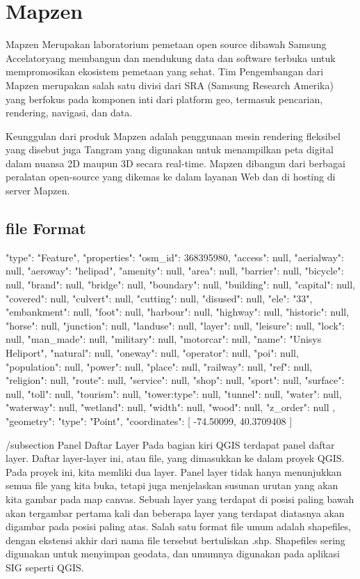 \section{Mapzen}
Mapzen Merupakan laboratorium pemetaan open source dibawah Samsung Accelatoryang membangun dan mendukung data dan software terbuka untuk mempromosikan ekosistem pemetaan yang sehat. Tim Pengembangan dari Mapzen merupakan salah satu divisi dari SRA (Samsung Research Amerika) yang berfokus pada komponen inti dari platform geo, termasuk pencarian, rendering, navigasi, dan data.

Keunggulan dari produk Mapzen adalah penggunaan mesin rendering fleksibel yang disebut juga Tangram yang digunakan untuk menampilkan peta digital dalam nuansa 2D maupun 3D secara real-time. Mapzen dibangun dari berbagai peralatan open-source yang dikemas ke dalam layanan Web dan di hosting di server Mapzen.

\subsection{file Format}
{
"type": "Feature",
"properties": {
    "osm_id": 368395980,
    "access": null,
    "aerialway": null,
    "aeroway": "helipad",
    "amenity": null,
    "area": null,
    "barrier": null,
    "bicycle": null,
    "brand": null,
    "bridge": null,
    "boundary": null,
    "building": null,
    "capital": null,
    "covered": null,
    "culvert": null,
    "cutting": null,
    "disused": null,
    "ele": "33",
    "embankment": null,
    "foot": null,
    "harbour": null,
    "highway": null,
    "historic": null,
    "horse": null,
    "junction": null,
    "landuse": null,
    "layer": null,
    "leisure": null,
    "lock": null,
    "man_made": null,
    "military": null,
    "motorcar": null,
    "name": "Unisys Heliport",
    "natural": null,
    "oneway": null,
    "operator": null,
    "poi": null,
    "population": null,
    "power": null,
    "place": null,
    "railway": null,
    "ref": null,
    "religion": null,
    "route": null,
    "service": null,
    "shop": null,
    "sport": null,
    "surface": null,
    "toll": null,
    "tourism": null,
    "tower:type": null,
    "tunnel": null,
    "water": null,
    "waterway": null,
    "wetland": null,
    "width": null,
    "wood": null,
    "z_order": null
},
"geometry": {
    "type": "Point",
    "coordinates": [
        -74.50099,
        40.3709408
    ]
}
}

/subsection {Panel Daftar Layer}
    Pada bagian kiri QGIS terdapat panel daftar layer. Daftar layer-layer ini, atau file, yang dimasukkan ke dalam proyek QGIS. Pada proyek ini, kita memliki dua layer.
    Panel layer tidak hanya menunjukkan semua file yang kita buka, tetapi juga menjelaskan susunan urutan yang akan kita gambar pada map canvas. Sebuah layer yang terdapat di posisi paling bawah akan tergambar pertama kali dan beberapa layer yang terdapat diatasnya akan digambar pada posisi paling atas.
    Salah satu format file umum adalah shapefiles, dengan ekstensi akhir dari nama file tersebut bertuliskan .shp. Shapefiles sering digunakan untuk menyimpan geodata, dan umumnya digunakan pada aplikasi SIG seperti QGIS.
